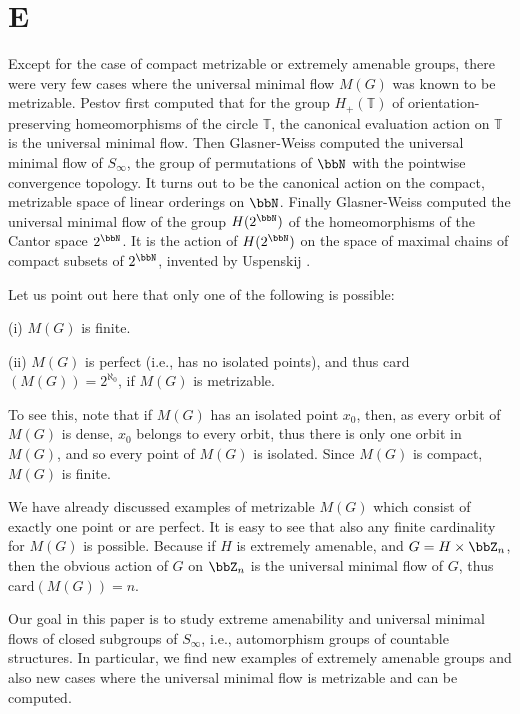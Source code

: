 \section{E}
Except for the case of compact metrizable or extremely amenable groups, there were very
few cases where the universal minimal flow $M(G)$ was known to be metrizable.
Pestov \cite{P98a} first computed that for the group $H_+(\mathbb T )$ of
orientation-preserving homeomorphisms of the circle $\mathbb T$, the canonical
evaluation action on $\mathbb T$ is the universal minimal flow.  Then
Glasner-Weiss \cite{GlW02} computed the universal minimal flow of $S_\infty$,
the group of permutations of $\bbN$ with the pointwise convergence topology.
It turns out to be the canonical action on the compact, metrizable space of
linear orderings on $\bbN$.  Finally Glasner-Weiss \cite{GlW03} computed the universal minimal flow of the
group $H(2^\bbN )$ of the homeomorphisms of the Cantor space $2^\bbN$.
It is the action of $H(2^\bbN )$ on the space of maximal chains of compact
subsets of $2^\bbN$, invented by Uspenskij \cite{Usp00}.

Let us point out here that only one of the following is possible:

(i) $M(G)$ is finite.

(ii) $M(G)$ is perfect (i.e., has no isolated points), and thus card$(M(G))=
    2^{\aleph_0}$, if $M(G)$ is metrizable.

To see this, note that if $M(G)$ has an isolated point $x_0$, then, as
every orbit of $M(G)$ is dense, $x_0$ belongs to every orbit, thus there is
only one orbit in $M(G)$, and so every point of $M(G)$ is isolated.
Since $M(G)$ is compact, $M(G)$ is finite.

We have already discussed examples of metrizable $M(G)$ which
consist of exactly one point or are perfect.  It is easy to see that also
any finite cardinality for $M(G)$ is possible.  Because if $H$ is extremely
amenable, and $G=H\times\bbZ_n$, then the obvious action of $G$ on $\bbZ_n$
is the universal minimal flow of $G$, thus card$(M(G))=n$.

Our goal in this paper is to study extreme amenability and universal
minimal flows of closed subgroups of $S_\infty$, i.e., automorphism
groups of countable structures.  In particular, we find new examples of
extremely amenable groups and also new cases where the universal minimal
flow is metrizable and can be computed.

